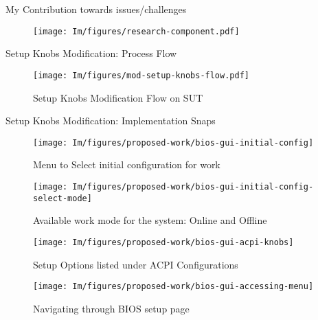 
\begin{frame}{My Contribution towards issues/challenges}
    \begin{figure}
        \centering
        \texttt{[image: Im/figures/research-component.pdf]}
    \end{figure}
\end{frame}

\begin{frame}[allowframebreaks]{Setup Knobs Modification: Process Flow}
    \begin{figure}[htbp]
        \centering
        \texttt{[image: Im/figures/mod-setup-knobs-flow.pdf]}
        \caption{Setup Knobs Modification Flow on SUT}
        \label{fig:setup-knobs-flow}
    \end{figure}
    
\end{frame}


\begin{frame}[allowframebreaks]{Setup Knobs Modification: Implementation Snaps}
    
    \begin{figure}[htbp]
        \centering
        \texttt{[image: Im/figures/proposed-work/bios-gui-initial-config]}
        \caption{Menu to Select initial configuration for work}\label{fig:proposed-work-bios-gui-initial-config}
    \end{figure}
    
    \begin{figure}[htbp]
        \centering
        \texttt{[image: Im/figures/proposed-work/bios-gui-initial-config-select-mode]}
        \caption{Available work mode for the system: Online and Offline}\label{fig:proposed-work-bios-gui-initial-config-select-mode}
    \end{figure}

    \begin{figure}[htbp]
        \centering
        \texttt{[image: Im/figures/proposed-work/bios-gui-acpi-knobs]}
        \caption{Setup Options listed under ACPI Configurations}\label{fig:proposed-work-bios-gui-acpi-knobs}
    \end{figure}

    \begin{figure}[htbp]
        \centering
        \texttt{[image: Im/figures/proposed-work/bios-gui-accessing-menu]}
        \caption{Navigating through BIOS setup page}\label{fig:proposed-work-bios-gui-accessing-menu}
    \end{figure}
\end{frame}

